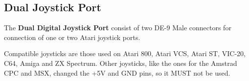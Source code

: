     \subsection{Dual Joystick Port}
    The \textbf{Dual Digital Joystick Port} consist of two DE-9 Male connectors
    for connection of one or two Atari joystick ports.

    Compatible joysticks are those used on Atari 800, Atari VCS, Atari ST,
    VIC-20, C64, Amiga and ZX Spectrum. Other joysticks, like the ones for the
    Amstrad CPC and MSX, changed the +5V and GND pins, so it MUST not be used.